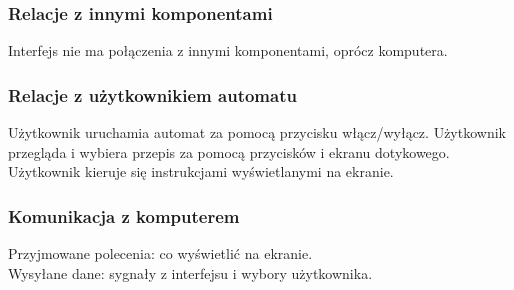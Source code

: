 \documentclass[12pt,a4paper,notitlepage]{report}
\begin{document}
\subsubsection{Relacje z innymi komponentami}
Interfejs nie ma połączenia z innymi komponentami, oprócz komputera.

\subsubsection{Relacje z użytkownikiem automatu}
Użytkownik uruchamia automat za pomocą przycisku włącz/wyłącz. Użytkownik przegląda i wybiera przepis za pomocą przycisków i ekranu dotykowego. Użytkownik kieruje się instrukcjami wyświetlanymi na ekranie.

\subsubsection{Komunikacja z komputerem}
Przyjmowane polecenia: co wyświetlić na ekranie.\\
Wysyłane dane: sygnały z interfejsu i wybory użytkownika.
\end{document}
